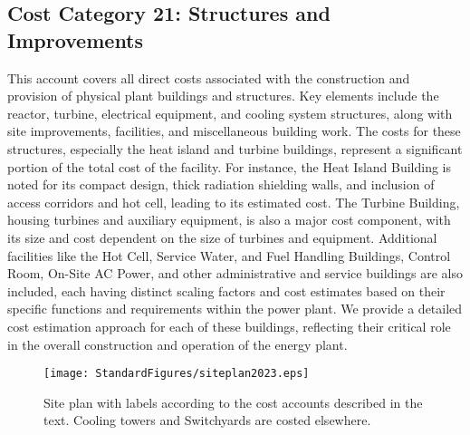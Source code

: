 
\subsection{Cost Category 21: Structures and Improvements}

This account covers all direct costs associated with the construction and provision of physical plant buildings and structures. Key elements include the reactor, turbine, electrical equipment, and cooling system structures, along with site improvements, facilities, and miscellaneous building work. The costs for these structures, especially the heat island and turbine buildings, represent a significant portion of the total cost of the facility. For instance, the Heat Island Building is noted for its compact design, thick radiation shielding walls, and inclusion of access corridors and hot cell, leading to its estimated cost. The Turbine Building, housing turbines and auxiliary equipment, is also a major cost component, with its size and cost dependent on the size of turbines and equipment. Additional facilities like the Hot Cell, Service Water, and Fuel Handling Buildings, Control Room, On-Site AC Power, and other administrative and service buildings are also included, each having distinct scaling factors and cost estimates based on their specific functions and requirements within the power plant. We provide a detailed cost estimation approach for each of these buildings, reflecting their critical role in the overall construction and operation of the energy plant.\\

\begin{figure}[h!] 
\centering 
\texttt{[image: StandardFigures/siteplan2023.eps]} 
\caption{Site plan with labels according to the cost accounts described in the text.  Cooling towers and Switchyards are costed elsewhere.} 
\label{fig:site} 
\end{figure} 



